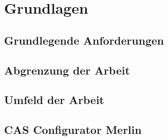 \chapter{Grundlagen} \label{chapter_2}

\section{Grundlegende Anforderungen}
\section{Abgrenzung der Arbeit}

\section{Umfeld der Arbeit}

\section{CAS Configurator Merlin}
